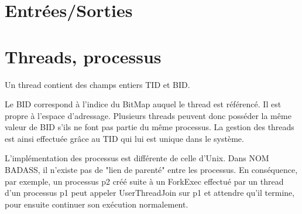 \documentclass[12pt]{report}
\begin{document}
\section{Entrées/Sorties}

%
%
%
%
%


\section{Threads, processus}

Un thread contient des champs entiers TID et BID.

Le BID correspond à l'indice du BitMap auquel le thread est référencé. Il est propre à l'espace d'adressage. Plusieurs threads peuvent donc posséder la même valeur de BID s'ils ne font pas partie du même processus. La gestion des threads est ainsi effectuée grâce au TID qui lui est unique dans le système.

\bigskip

L'implémentation des processus est différente de celle d'Unix. Dans \color{red}NOM BADASS\color{black}, il n'existe pas de "lien de parenté" entre les processus. En conséquence, par exemple, un processus p2 créé suite à un ForkExec effectué par un thread d'un processus p1 peut appeler UserThreadJoin sur p1 et attendre qu'il termine, pour ensuite continuer son exécution normalement.
\bigskip
\end{document}

